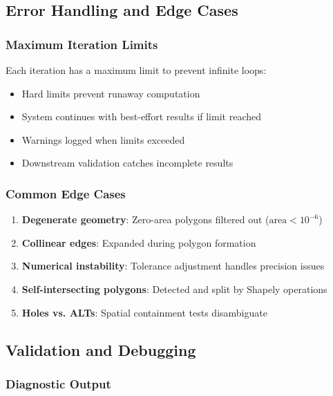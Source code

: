 \subsection{Error Handling and Edge Cases}

\subsubsection{Maximum Iteration Limits}

Each iteration has a maximum limit to prevent infinite loops:

\begin{itemize}
    \item Hard limits prevent runaway computation
    \item System continues with best-effort results if limit reached
    \item Warnings logged when limits exceeded
    \item Downstream validation catches incomplete results
\end{itemize}

\subsubsection{Common Edge Cases}

\begin{enumerate}
    \item \textbf{Degenerate geometry}: Zero-area polygons filtered out ($\text{area} < 10^{-6}$)
    \item \textbf{Collinear edges}: Expanded during polygon formation
    \item \textbf{Numerical instability}: Tolerance adjustment handles precision issues
    \item \textbf{Self-intersecting polygons}: Detected and split by Shapely operations
    \item \textbf{Holes vs. ALTs}: Spatial containment tests disambiguate
\end{enumerate}

\subsection{Validation and Debugging}

\subsubsection{Diagnostic Output}

